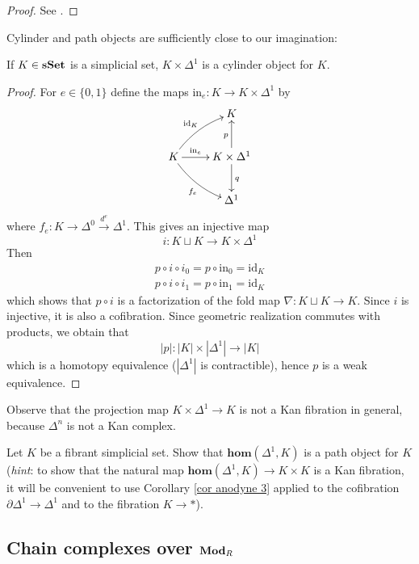 \begin{refsection}
\begin{proof}
See \cite[Theorem I.11.3]{gj}.
\end{proof}

Cylinder and path objects are sufficiently close to our imagination:

\begin{prop}
If $K \in \mathbf{s\,\!\mathbf{Set}}$ is a simplicial set, $K \times \Delta^1$ is a cylinder object for $K$.
\end{prop}

\begin{proof}
For $e \in \{0,1\}$ define the maps $\mathrm{in}_e \colon K \to K \times \Delta^1$ by
\[
\xymatrix{
& K \\
K \ar@/^.5pc/[ur]^{\mathrm{id}_K} \ar@/_.5pc/[dr]_{f_e} \ar[r]^-{\mathrm{in}_e} & K \times \Delta^1 \ar[u]^p \ar[d]^q \\ & \Delta^1
}
\]
where $f_e \colon K \to \Delta^0 \xrightarrow{d^e} \Delta^1$. This gives an injective map
\[
i \colon K \sqcup K \to K \times \Delta^1
\]
Then
\begin{gather*}
p \circ i \circ i_0 = p \circ \mathrm{in}_0 = \mathrm{id}_K \\
p \circ i \circ i_1 = p \circ \mathrm{in}_1 = \mathrm{id}_K
\end{gather*}
which shows that $p \circ i$ is a factorization of the fold map $\nabla \colon K \sqcup K \to K$. Since $i$ is injective, it is also a cofibration. Since geometric realization commutes with products, we obtain that
\[
|p| \colon |K| \times |\Delta^1| \to |K|
\]
which is a homotopy equivalence ($|\Delta^1|$ is contractible), hence $p$ is a weak equivalence.
\end{proof}

\begin{rmk}
Observe that the projection map $K \times \Delta^1 \to K$ is not a Kan fibration in general, because $\Delta^n$ is not a Kan complex.
\end{rmk}

\begin{exercise}
Let $K$ be a fibrant simplicial set. Show that $\mathbf{hom}(\Delta^1,K)$ is a path object for $K$ (\emph{hint}: to show that the natural map $\mathbf{hom}(\Delta^1, K) \to K \times K$ is a Kan fibration, it will be convenient to use Corollary \ref{cor anodyne 3} applied to the cofibration $\partial \Delta^1 \to \Delta^1$ and to the fibration $K \to *$).
\end{exercise}

\subsection{Chain complexes over $\mathbf{Mod}_R$} \label{chain complexes}


\end{refsection}
